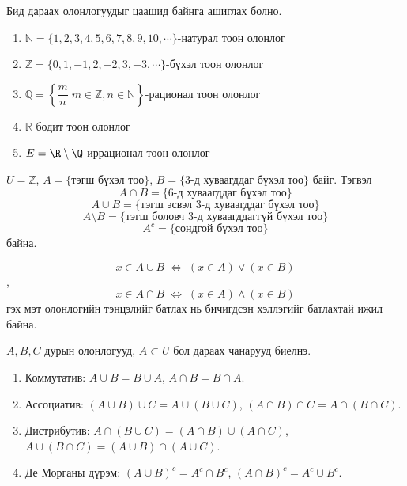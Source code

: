\begin{remark} Бид дараах олонлогуудыг цаашид байнга ашиглах болно.
\begin{enumerate}
\item $\mathbb{N}=\{1, 2, 3, 4, 5, 6, 7, 8, 9, 10, \cdots \}$-натурал тоон олонлог
\item $\mathbb{Z}=\{0, 1, -1,  2, -2, 3, -3, \cdots \}$-бүхэл тоон олонлог
\item $\mathbb{Q}=\left\{\dfrac{m}{n}|m\in\mathbb{Z} , n\in\mathbb{N} \right\}$-рационал тоон олонлог
\item $\mathbb{R}$ бодит тоон олонлог
\item $E=\R\setminus \Q$ иррационал тоон олонлог
\end{enumerate}    
\end{remark}
\begin{example}
   $U=\mathbb{Z}$, $A=\{ \text{тэгш бүхэл тоо}\}$, $B=\{ \text{3-д хуваагддаг бүхэл тоо}\}$ байг. Тэгвэл
$$A\cap B=\{ \text{6-д хуваагддаг бүхэл тоо}\}$$
$$A\cup B=\{ \text{тэгш эсвэл 3-д хуваагддаг бүхэл тоо}\}$$
$$A\setminus B=\{ \text{тэгш боловч 3-д хуваагддаггүй бүхэл тоо}\}$$
 $$A^c=\{ \text{сондгой бүхэл тоо}\}$$ байна.
\end{example}
\begin{note}
$$x\in A\cup B \;\Leftrightarrow\; (x\in A)\lor(x\in B)$$,
$$x\in A\cap B \;\Leftrightarrow\; (x\in A)\land(x\in B)$$ 
гэх мэт олонлогийн тэнцэлийг батлах нь  бичигдсэн хэллэгийг батлахтай ижил байна.   
\end{note}
\begin{theorem}\label{Олонлогийн тэнцэтгэлцлийн хууль}
    $A, B, C$ дурын олонлогууд, $A\subset U$ бол дараах чанарууд биелнэ.
\begin{enumerate}
  \item Коммутатив: $A\cup B=B\cup A$, $A\cap B=B\cap A$.
  \item Ассоциатив: $(A\cup B)\cup C=A\cup(B\cup C)$, $(A\cap B)\cap C=A\cap(B\cap C)$.
  \item Дистрибутив: $A\cap(B\cup C)=(A\cap B)\cup(A\cap C)$, $A\cup(B\cap C)=(A\cup B)\cap(A\cup C)$.
  \item Де Морганы дүрэм: $(A\cup B)^c=A^c\cap B^c$, $(A\cap B)^c=A^c\cup B^c$.
\end{enumerate}
\end{theorem}
